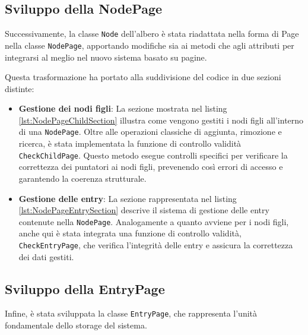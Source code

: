 \documentclass[12pt,a4paper,openright,twoside]{book}
\begin{document}
            \subsection{Sviluppo della NodePage}

                Successivamente, la classe \texttt{Node} dell'albero è stata riadattata nella forma di Page nella classe \texttt{NodePage}, apportando modifiche sia ai metodi che agli attributi per integrarsi al meglio nel nuovo sistema basato su pagine.

                Questa trasformazione ha portato alla suddivisione del codice in due sezioni distinte:

                \begin{itemize}
                    \item \textbf{Gestione dei nodi figli}: La sezione mostrata nel listing \cref{lst:NodePageChildSection} illustra come vengono gestiti i nodi figli all'interno di una \texttt{NodePage}. Oltre alle operazioni classiche di aggiunta, rimozione e ricerca, è stata implementata la funzione di controllo validità \texttt{CheckChildPage}. Questo metodo esegue controlli specifici per verificare la correttezza dei puntatori ai nodi figli, prevenendo così errori di accesso e garantendo la coerenza strutturale.

                    \item \textbf{Gestione delle entry}: La sezione rappresentata nel listing \cref{lst:NodePageEntrySection} descrive il sistema di gestione delle entry contenute nella \texttt{NodePage}. Analogamente a quanto avviene per i nodi figli, anche qui è stata integrata una funzione di controllo validità, \texttt{CheckEntryPage}, che verifica l'integrità delle entry e assicura la correttezza dei dati gestiti.
                \end{itemize}

            

            

            \subsection{Sviluppo della EntryPage}

                Infine, è stata sviluppata la classe \texttt{EntryPage}, che rappresenta l'unità fondamentale dello storage del sistema.
\end{document}
